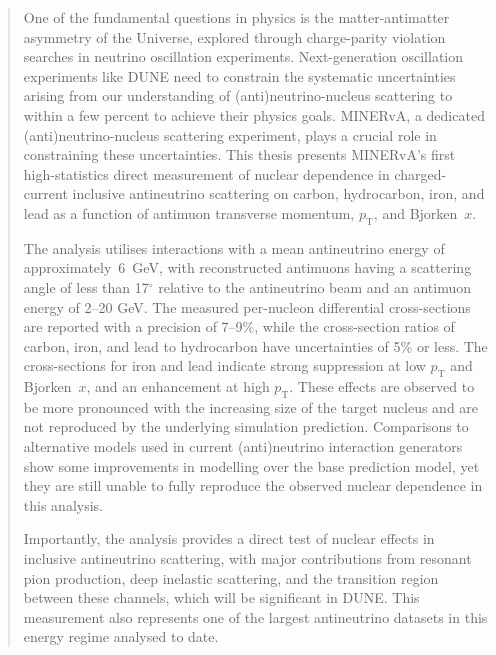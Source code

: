 
\begin{abstract}
\vspace{15pt}

One of the fundamental questions in physics is the matter-antimatter asymmetry of the Universe, explored through charge-parity violation searches in neutrino oscillation experiments. Next-generation oscillation experiments like DUNE need to constrain the systematic uncertainties arising from our understanding of (anti)neutrino-nucleus scattering to within a few percent to achieve their physics goals. MINERvA, a dedicated (anti)neutrino-nucleus scattering experiment, plays a crucial role in constraining these uncertainties. This thesis presents MINERvA's first high-statistics direct measurement of nuclear dependence in charged-current inclusive antineutrino scattering on carbon, hydrocarbon, iron, and lead as a function of antimuon transverse momentum, $p_{\text{T}}$, and Bjorken~$x$.

The analysis utilises interactions with a mean antineutrino energy of approxima\-tely~6~GeV, with reconstructed antimuons having a scattering angle of less than 17$^\circ$ relative to the antineutrino beam and an antimuon energy of 2--20 GeV. The measured per-nucleon differential cross-sections are reported with a precision of 7--9\%, while the cross-section ratios of carbon, iron, and lead to hydrocarbon have uncertainties of 5\% or less. The cross-sections for iron and lead indicate strong suppression at low $p_{\text{T}}$ and Bjorken~$x$, and an enhancement at high $p_{\text{T}}$. These effects are observed to be more pronounced with the increasing size of the target nucleus and are not reproduced by the underlying simulation prediction. Comparisons to alternative models used in current (anti)neutrino interaction generators show some improvements in modelling over the base prediction model, yet they are still unable to fully reproduce the observed nuclear dependence in this analysis.

Importantly, the analysis provides a direct test of nuclear effects in inclusive antineutrino scattering, with major contributions from resonant pion production, deep inelastic scattering, and the transition region between these channels, which will be significant in DUNE. This measurement also represents one of the largest antineutrino datasets in this energy regime analysed to date.


\end{abstract}
